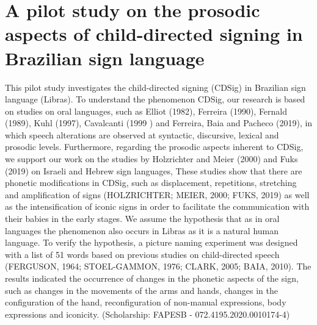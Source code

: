 \chapter{A pilot study on the prosodic aspects of child-directed signing in Brazilian sign language}\label{ch:marcelomeiraa28}
\begin{affils}
\end{affils}


This pilot study investigates the child-directed signing (CDSig) in Brazilian sign language (Libras). To understand the phenomenon CDSig, our research is based on studies on oral languages, such as Elliot (1982), Ferreira (1990),  Fernald (1989), Kuhl (1997), Cavalcanti (1999 ) and Ferreira, Baia and Pacheco  (2019), in which speech alterations are observed at syntactic, discursive, lexical and prosodic levels. Furthermore, regarding the prosodic aspects inherent to CDSig, we support our work on the studies by Holzrichter and Meier (2000) and Fuks (2019) on Israeli and Hebrew sign languages, These studies show that there are phonetic modifications in CDSig, such as displacement, repetitions, stretching and amplification of signs (HOLZRICHTER; MEIER, 2000; FUKS, 2019) as well as the intensification of iconic signs in order to facilitate the communication with their babies in the early stages. We assume the hypothesis that as in oral languages the phenomenon also occurs in Libras as it is a natural human language. To verify the hypothesis, a picture naming experiment was designed with a list of 51 words based on previous studies on child-directed speech (FERGUSON, 1964; STOEL-GAMMON, 1976; CLARK, 2005; BAIA, 2010). The results indicated the occurrence of changes in the phonetic aspects of the sign, such as changes in the movements of the arms and hands, changes in the configuration of the hand, reconfiguration of non-manual expressions, body expressions and iconicity. (Scholarship: FAPESB - 072.4195.2020.0010174-4)
